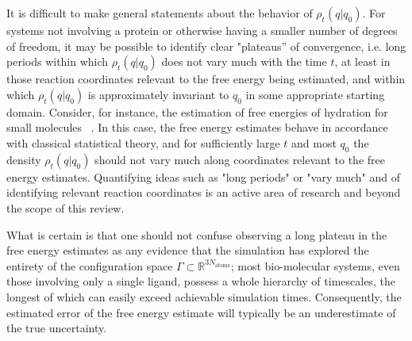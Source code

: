 It is difficult to make general statements about the behavior of $\rho_t (q | q_0)$. For systems not involving a protein or otherwise having a smaller number of degrees of freedom, it may be possible to identify clear "plateaus'' of convergence, i.e. long periods within which $\rho_t (q|q_0)$ does not vary much with the time $t$, at least in those reaction coordinates relevant to the free energy being estimated, and within which $\rho_t (q|q_0)$ is approximately invariant to $q_0$ in some appropriate starting domain. Consider, for instance, the estimation of free energies of hydration for small molecules ~\cite{paliwal2011benchmark}. In this case, the free energy estimates behave in accordance with classical statistical theory, and for sufficiently large $t$ and most $q_0$ the density $\rho_t (q | q_0)$ should not vary much along coordinates relevant to the free energy estimates. Quantifying ideas such as "long periods" or "vary much"  and of identifying relevant reaction coordinates is an active area of research and beyond the scope of this review.


What is certain is that one should not confuse observing a long plateau in the free energy estimates as any evidence that the simulation has explored the entirety of the configuration space $\Gamma \subset \mathbb{R}^{3N_{\mathrm{atoms}}}$; most bio-molecular systems, even those involving only a single ligand, possess a whole hierarchy of timescales, the longest of which can easily exceed achievable simulation times. Consequently, the estimated error of the free energy estimate will typically be an underestimate of the true uncertainty.


